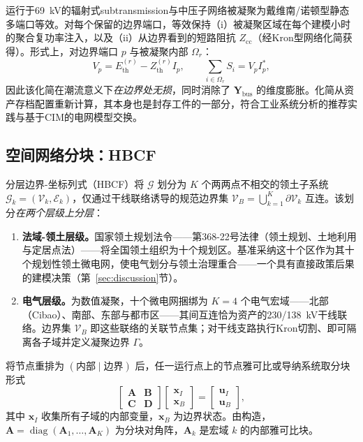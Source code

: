 运行于69~kV的辐射式subtransmission与中压子网络被凝聚为戴维南/诺顿型静态多端口等效。对每个保留的边界端口，等效保持（i）被凝聚区域在每个建模小时的聚合复功率注入，以及（ii）从边界看到的短路阻抗 $Z_{\mathrm{cc}}$（经Kron型网络化简获得）。形式上，对边界端口 $p$ 与被凝聚内部 $\Omega_r$：
\begin{equation}
V_p = E_{\mathrm{th}}^{(r)} - Z_{\mathrm{th}}^{(r)} I_p, \qquad \sum_{i \in \Omega_r} S_i = V_p I_p^{*},
\label{eq:thevenin}
\end{equation}
因此该化简在潮流意义下\emph{在边界处无损}，同时消除了 $\mathbf{Y}_{\mathrm{bus}}$ 的维度膨胀。化简从资产存档配置重新计算，其本身也是封存工件的一部分，符合工业系统分析的推荐实践\cite{ieee399}与基于CIM的电网模型交换\cite{iec61970}。

\subsection{空间网络分块：HBCF}
\label{sub:hbcf}

分层边界-坐标列式（HBCF）将 $\mathcal{G}$ 划分为 $K$ 个两两点不相交的领土子系统 $\mathcal{G}_k = (\mathcal{V}_k, \mathcal{E}_k)$，仅通过干线联络诱导的规范边界集 $\mathcal{V}_B = \bigcup_{k=1}^{K} \partial \mathcal{V}_k$ 互连。该划分\emph{在两个层级上分层}：
\begin{enumerate}
\item \textbf{法域-领土层级。}国家领土规划法令——第368-22号法律（领土规划、土地利用与定居点法）\cite{ley368}——将全国领土组织为十个规划区。基准采纳这十个区作为其十个规划性领土微电网，使电气划分与领土治理重合——一个具有直接政策后果的建模决策（第~\ref{sec:discussion}节）。
\item \textbf{电气层级。}为数值凝聚，十个微电网捆绑为 $K = 4$ 个电气宏域——北部（Cibao）、南部、东部与都市区——其间互连恰为资产的230/138~kV干线联络。边界集 $\mathcal{V}_B$ 即这些联络的关联节点集；对干线支路执行Kron切割\cite{kron1963}、\cite{happ1971}即可隔离各子域并定义凝聚边界 $\Gamma$。
\end{enumerate}

将节点重排为 $(\text{内部} \mid \text{边界})$ 后，任一运行点上的节点雅可比或导纳系统取分块形式
\begin{equation}
\begin{bmatrix} \mathbf{A} & \mathbf{B} \\ \mathbf{C} & \mathbf{D} \end{bmatrix} \begin{bmatrix} \mathbf{x}_I \\ \mathbf{x}_B \end{bmatrix} = \begin{bmatrix} \mathbf{u}_I \\ \mathbf{u}_B \end{bmatrix},
\label{eq:blockform}
\end{equation}
其中 $\mathbf{x}_I$ 收集所有子域的内部变量，$\mathbf{x}_B$ 为边界状态。由构造，$\mathbf{A} = \operatorname{diag}(\mathbf{A}_1, \dots, \mathbf{A}_K)$ 为分块对角阵，$\mathbf{A}_k$ 是宏域 $k$ 的内部雅可比块。

